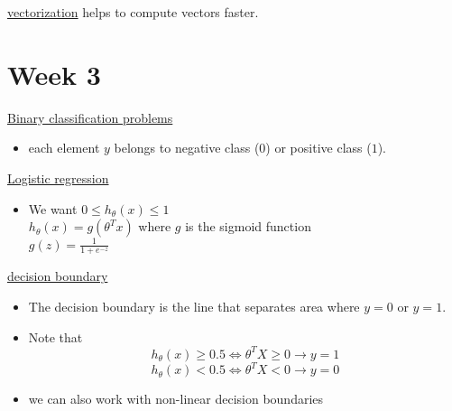 \documentclass[12pt]{article}
\begin{document}
\underline{vectorization} helps to compute vectors faster.
\newpage
\section*{Week 3}

\underline{Binary classification problems}
\begin{itemize}
	\item each element $y$ belongs to negative class ($0$) or positive class ($1$).
\end{itemize}

\underline{Logistic regression}
	\begin{itemize}
		\item We want $0\leq h_\theta(x) \leq 1$\\
		$h_\theta(x) = g(\theta^Tx)$ where $g$ is the sigmoid function\\
		$g(z) = \frac{1}{1+e^{-z}}$
	\end{itemize}

\underline{decision boundary}
\begin{itemize}

\item The decision boundary is the line that separates area where $y=0$ or $y=1$.
\item Note that 
\[h_\theta(x)\geq0.5\iff \theta^TX\geq 0 \to y=1\]
\[h_\theta(x)<0.5\iff \theta^TX< 0 \to y=0\]
	\item we can also work with non-linear decision boundaries
\end{itemize}
\end{document}
